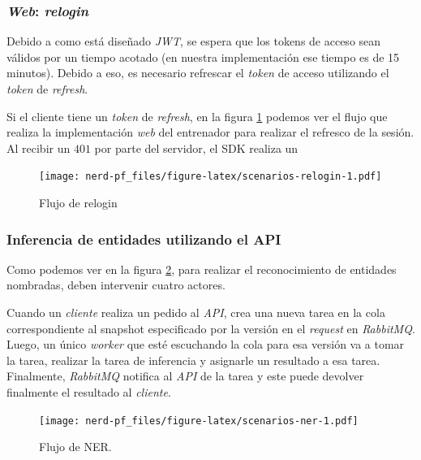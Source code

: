 \documentclass[12pt,a4paper,]{scrartcl}
\begin{document}
\hypertarget{web-relogin}{%
\subsubsection{\texorpdfstring{\emph{Web}: \emph{relogin}}{Web: relogin}}\label{web-relogin}}

Debido a como está diseñado \emph{JWT}, se espera que los tokens de acceso sean válidos por un tiempo acotado (en nuestra implementación ese tiempo es de 15 minutos). Debido a eso, es necesario refrescar el \emph{token} de acceso utilizando el \emph{token} de \emph{refresh}.

Si el cliente tiene un \emph{token} de \emph{refresh}, en la figura \ref{fig:scenarios-relogin} podemos ver el flujo que realiza la implementación \emph{web} del entrenador para realizar el refresco de la sesión. Al recibir un \(401\) por parte del servidor, el SDK realiza un

\begin{figure}[H]

{\centering \texttt{[image: nerd-pf\_files/figure-latex/scenarios-relogin-1.pdf]} 

}

\caption{Flujo de relogin}\label{fig:scenarios-relogin}
\end{figure}

\hypertarget{inferencia-de-entidades-utilizando-el-api}{%
\subsubsection{Inferencia de entidades utilizando el API}\label{inferencia-de-entidades-utilizando-el-api}}

Como podemos ver en la figura \ref{fig:scenarios-ner}, para realizar el reconocimiento de entidades nombradas, deben intervenir cuatro actores.

Cuando un \emph{cliente} realiza un pedido al \emph{API}, crea una nueva tarea en la cola correspondiente al snapshot especificado por la versión en el \emph{request} en \emph{RabbitMQ}. Luego, un único \emph{worker} que esté escuchando la cola para esa versión va a tomar la tarea, realizar la tarea de inferencia y asignarle un resultado a esa tarea. Finalmente, \emph{RabbitMQ} notifica al \emph{API} de la tarea y este puede devolver finalmente el resultado al \emph{cliente}.

\begin{figure}[H]

{\centering \texttt{[image: nerd-pf\_files/figure-latex/scenarios-ner-1.pdf]} 

}

\caption{Flujo de NER.}\label{fig:scenarios-ner}
\end{figure}
\end{document}
